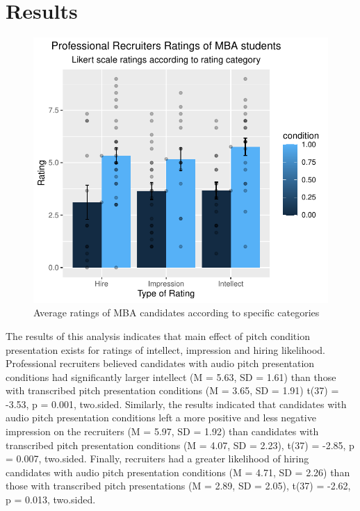 \documentclass[
  english,
  man,floatsintext]{apa6}
\begin{document}
\hypertarget{results}{%
\section{Results}\label{results}}

\begin{figure}
\centering
\includegraphics{PapajaPaper_Poweranalysis_files/figure-latex/unnamed-chunk-2-1.pdf}
\caption{\label{fig:unnamed-chunk-2}Average ratings of MBA candidates according to specific categories}
\end{figure}

The results of this analysis indicates that main effect of pitch condition presentation exists for ratings of intellect, impression and hiring likelihood. Professional recruiters believed candidates with audio pitch presentation conditions had significantly larger intellect (M = 5.63, SD = 1.61) than those with transcribed pitch presentation conditions (M = 3.65, SD = 1.91) t(37) = -3.53, p = 0.001, two.sided. Similarly, the results indicated that candidates with audio pitch presentation conditions left a more positive and less negative impression on the recruiters (M = 5.97, SD = 1.92) than candidates with transcribed pitch presentation conditions (M = 4.07, SD = 2.23), t(37) = -2.85, p = 0.007, two.sided. Finally, recruiters had a greater likelihood of hiring candidates with audio pitch presentation conditions (M = 4.71, SD = 2.26) than those with transcribed pitch presentations (M = 2.89, SD = 2.05), t(37) = -2.62, p = 0.013, two.sided.
\end{document}
